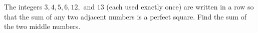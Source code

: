 The integers $3, 4, 5, 6, 12,$ and $13$ (each used exactly once) are written in a row so that the sum of any two adjacent numbers is a perfect square. Find the sum of the two middle numbers.
